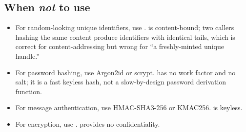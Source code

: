 \subsection{When \emph{not} to use \pqhash{}}

\begin{itemize}
\item For random-looking unique identifiers, use \pqid{}. \pqhash{} is content-bound; two callers hashing the same content produce identifiers with identical tails, which is correct for content-addressing but wrong for ``a freshly-minted unique handle.''
\item For password hashing, use Argon2id \citep{rfc9106} or scrypt. \pqhash{} has no work factor and no salt; it is a fast keyless hash, not a slow-by-design password derivation function.
\item For message authentication, use HMAC-SHA3-256 or KMAC256. \pqhash{} is keyless.
\item For encryption, use \pqcrypt{}. \pqhash{} provides no confidentiality.
\end{itemize}
